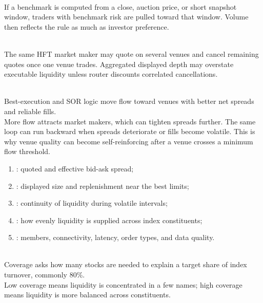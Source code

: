 \documentclass[a4paper,oneside,openany]{book}
\begin{document}
\begin{caveat} \\
If a benchmark is computed from a close, auction price, or short snapshot window, traders with benchmark risk are pulled toward that window. Volume then reflects the rule as much as investor preference.
\end{caveat}

\begin{caveat} \\
The same HFT market maker may quote on several venues and cancel remaining quotes once one venue trades. Aggregated displayed depth may overstate executable liquidity unless router discounts correlated cancellations.
\end{caveat}

\begin{mechanism} \\
Best-execution and SOR logic move flow toward venues with better net spreads and reliable fills.\\
More flow attracts market makers, which can tighten spreads further. The same loop can run backward when spreads deteriorate or fills become volatile. This is why venue quality can become self-reinforcing after a venue crosses a minimum flow threshold.
\end{mechanism}

\begin{taxonomy} 
\begin{enumerate}[label=\roman*.]
\setlength{\itemsep}{0pt}
\item {}: quoted and effective bid-ask spread;
\item {}: displayed size and replenishment near the best limits;
\item {}: continuity of liquidity during volatile intervals;
\item {}: how evenly liquidity is supplied across index constituents;
\item {}: members, connectivity, latency, order types, and data quality.
\end{enumerate}
\end{taxonomy}

\begin{definition} \\
Coverage asks how many stocks are needed to explain a target share of index turnover, commonly 80\%.\\
Low coverage means liquidity is concentrated in a few names; high coverage means liquidity is more balanced across constituents.
\end{definition}
\end{document}
